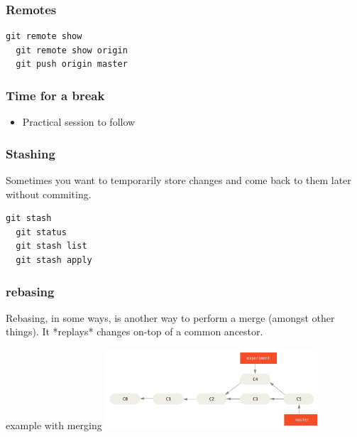 \documentclass{beamer}
\begin{document}

\begin{frame}[fragile]
  \frametitle{Remotes}
  
  \begin{lstlisting}[caption=Remotes] 
  git remote show
  git remote show origin
  git push origin master
  \end{lstlisting}

\end{frame}


\begin{frame}
  \frametitle{Time for a break}
 
  \begin{itemize} 
    \item Practical session to follow 
  \end{itemize}
 
\end{frame}




\begin{frame}[fragile]
  \frametitle{Stashing}
  Sometimes you want to temporarily store changes and come back to them later without commiting.

  \begin{lstlisting}[caption=stashing] 
  git stash
  git status
  git stash list
  git stash apply
  \end{lstlisting}

\end{frame}


\begin{frame}
  \frametitle{rebasing}
    Rebasing, in some ways, is another way to perform a merge (amongst other things). It *replays* changes on-top of a common ancestor.


  \begin{block}{example with merging}
    \includegraphics[height=3cm]{basic-rebase-2.png}
  \end{block}

\end{frame}
\end{document}
